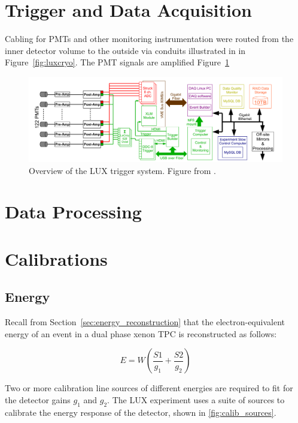 \section{Trigger and Data Acquisition}
Cabling for PMTs and other monitoring instrumentation were routed from the inner detector volume to the outside via conduits illustrated in in Figure~\ref{fig:luxcryo}. The \ac{PMT} signals are amplified Figure~\ref{fig:luxdaq}

\begin{figure}[htbp]
\begin{center}
\includegraphics[width=\textwidth]{figures/lux/lux_daq.png}
\caption{Overview of the LUX trigger system. Figure from \cite{LUXTrigger}. }
\label{fig:luxdaq}
\end{center}
\end{figure}


\section{Data Processing}


\section{Calibrations}
\subsection{Energy}
Recall from Section~\ref{sec:energy_reconstruction} that the electron-equivalent energy of an event in a dual phase xenon \ac{TPC} is reconstructed as follows:

\begin{equation}
E = W (\frac{S1}{g_{1}} + \frac{S2}{g_{2}})
\end{equation}

 
Two or more calibration line sources of different energies are required to fit for the detector gains $g_{1}$ and $g_{2}$. The \ac{LUX} experiment uses a suite of sources to calibrate the energy response of the detector, shown in \ref{fig:calib_sources}.

